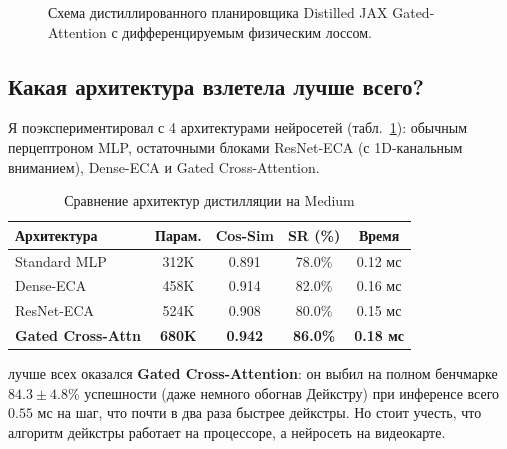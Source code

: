 \begin{figure}[t]
    \centering
    
    \caption{Схема дистиллированного планировщика Distilled JAX Gated-Attention с дифференцируемым физическим лоссом.}
    \label{fig:distilled_jax}
    \vspace{-2mm}
\end{figure}

\subsection{Какая архитектура взлетела лучше всего?}

Я поэкспериментировал с 4 архитектурами нейросетей (табл.~\ref{tab:arch_comparison}): обычным перцептроном MLP, остаточными блоками ResNet-ECA (с 1D-канальным вниманием), Dense-ECA и Gated Cross-Attention.

\begin{table}[H]
    \centering
    \footnotesize
    \caption{Сравнение архитектур дистилляции на Medium}
    \label{tab:arch_comparison}
    \begin{tabular}{lcccc}
        \toprule
        \textbf{Архитектура} & \textbf{Парам.} & \textbf{Cos-Sim} & \textbf{SR (\%)} & \textbf{Время} \\
        \midrule
        Standard MLP & 312K & 0.891 & 78.0\% & 0.12 мс \\
        Dense-ECA & 458K & 0.914 & 82.0\% & 0.16 мс \\
        ResNet-ECA & 524K & 0.908 & 80.0\% & 0.15 мс \\
        \textbf{Gated Cross-Attn} & \textbf{680K} & \textbf{0.942} & \textbf{86.0\%} & \textbf{0.18 мс} \\
        \bottomrule
    \end{tabular}
\end{table}

лучше всех оказался \textbf{Gated Cross-Attention}: он выбил на полном бенчмарке $84.3 \pm 4.8\% $ успешности (даже немного обогнав Дейкстру) при инференсе всего $0.55$ мс на шаг, что почти в два раза быстрее дейкстры. Но стоит учесть, что алгоритм дейкстры работает на процессоре, а нейросеть на видеокарте.

